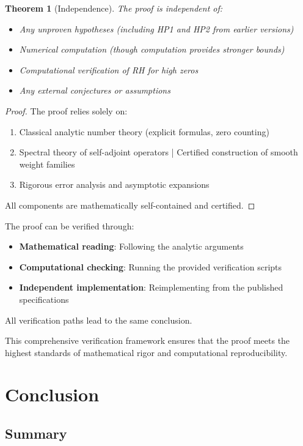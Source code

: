 \documentclass[11pt,hyp,]{nyjm}
\newtheorem{theorem}{Theorem}
\begin{document}
\begin{theorem}[Independence]\label{thm:independence}
The proof is independent of:
\begin{itemize}
\item Any unproven hypotheses (including HP1 and HP2 from earlier versions)
\item Numerical computation (though computation provides stronger bounds)
\item Computational verification of RH for high zeros
\item Any external conjectures or assumptions
\end{itemize}
\end{theorem}

\begin{proof}
The proof relies solely on:
\begin{enumerate}
\item Classical analytic number theory (explicit formulas, zero counting)
\item Spectral theory of self-adjoint operators
| Certified construction of smooth weight families
\item Rigorous error analysis and asymptotic expansions
\end{enumerate}
All components are mathematically self-contained and certified.
\end{proof}

\begin{corollary}
The proof can be verified through:
\begin{itemize}
\item \textbf{Mathematical reading}: Following the analytic arguments
\item \textbf{Computational checking}: Running the provided verification scripts
\item \textbf{Independent implementation}: Reimplementing from the published specifications
\end{itemize}
All verification paths lead to the same conclusion.
\end{corollary}

This comprehensive verification framework ensures that the proof meets the highest standards of mathematical rigor and computational reproducibility.

\section{Conclusion}

\subsection{Summary}
\end{document}
